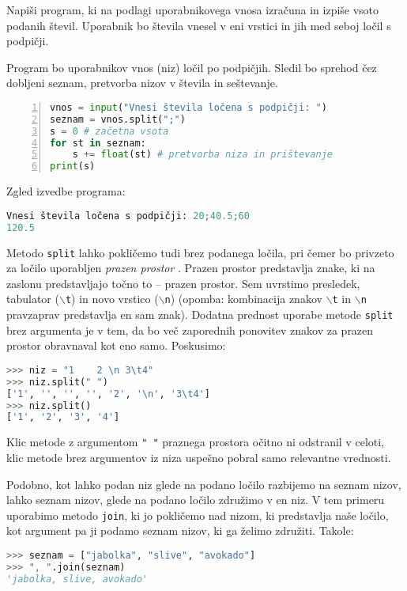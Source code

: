 \begin{zgled}
Napiši program, ki na podlagi uporabnikovega vnosa izračuna in izpiše vsoto podanih števil. Uporabnik bo števila vnesel v eni vrstici in jih med seboj ločil s podpičji. 
\end{zgled}
\begin{resitev}
Program bo uporabnikov vnos (niz) ločil po podpičjih. Sledil bo sprehod čez dobljeni seznam, pretvorba nizov v števila in seštevanje.
\begin{lstlisting}[language=Python,numbers=left]
vnos = input("Vnesi števila ločena s podpičji: ")
seznam = vnos.split(";")
s = 0 # začetna vsota
for st in seznam:
    s += float(st) # pretvorba niza in prištevanje
print(s)
\end{lstlisting}
Zgled izvedbe programa:
\begin{lstlisting}[language=Python]
Vnesi števila ločena s podpičji: 20;40.5;60
120.5
\end{lstlisting}
\end{resitev}

Metodo \texttt{split} lahko pokličemo tudi brez podanega ločila, pri čemer bo privzeto za ločilo uporabljen \emph{prazen prostor} . Prazen prostor predstavlja znake, ki na zaslonu predstavljajo točno to -- prazen prostor. Sem uvrstimo presledek, tabulator (\texttt{$\backslash$t}) in novo vrstico (\texttt{$\backslash$n}) (opomba: kombinacija znakov \texttt{$\backslash$t} in \texttt{$\backslash$n} pravzaprav predstavlja en sam znak). Dodatna prednost uporabe metode \texttt{split} brez argumenta je v tem, da bo več zaporednih ponovitev znakov za prazen prostor obravnaval kot eno samo. Poskusimo:
\begin{lstlisting}[language=Python]
>>> niz = "1    2 \n 3\t4"
>>> niz.split(" ")
['1', '', '', '', '2', '\n', '3\t4']
>>> niz.split()
['1', '2', '3', '4']
\end{lstlisting}
Klic metode z argumentom \texttt{" "} praznega prostora očitno ni odstranil v celoti, klic metode brez argumentov iz niza uspešno pobral samo relevantne vrednosti. 

Podobno, kot lahko podan niz glede na podano ločilo razbijemo na seznam nizov, lahko seznam nizov, glede na podano ločilo združimo v en niz. V tem primeru uporabimo metodo \texttt{join}, ki jo pokličemo nad nizom, ki predstavlja naše ločilo, kot argument pa ji podamo seznam nizov, ki ga želimo združiti. Takole: 
\begin{lstlisting}[language=Python]
>>> seznam = ["jabolka", "slive", "avokado"]
>>> ", ".join(seznam)
'jabolka, slive, avokado'
\end{lstlisting}


